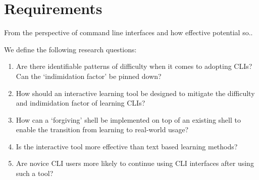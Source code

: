 \section{Requirements}

From the perspective of command line interfaces and how effective potential so..

We define the following research questions:

\begin{enumerate}[label=\textbf{RQ \arabic*}]
	\item Are there identifiable patterns of difficulty when it
        comes to adopting CLIs? Can the `indimidation factor' be pinned down? \label{rq:1}
	\item How should an interactive learning tool be designed to mitigate
	      the difficulty and indimidation factor of learning CLIs? \label{rq:2}
	\item How can a `forgiving' shell be implemented on top of an existing
	      shell to enable the transition from learning to real-world usage? \label{rq:3}
	\item Is the interactive tool more effective than text based learning methods? \label{rq:4}
	\item Are novice CLI users more likely to continue
        using CLI interfaces after using such a tool? \label{rq:5}
\end{enumerate}

